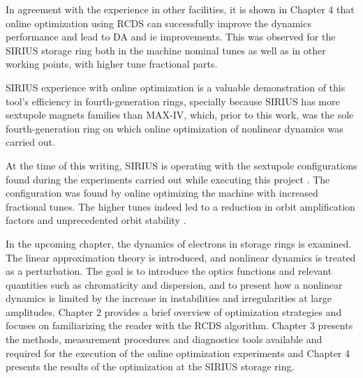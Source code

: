 In agreement with the experience in other facilities, it is shown in Chapter 4 that online optimization using \gls*{RCDS} can successfully improve the dynamics performance and lead to \gls*{DA} and \gls*{ie} improvements. This was observed for the SIRIUS storage ring both in the machine nominal tunes as well as in other working points, with higher tune fractional parts.

SIRIUS experience with online optimization is a valuable demonstration of this tool's efficiency in fourth-generation rings, specially because SIRIUS has more sextupole magnets families than MAX-IV, which, prior to this work, was the sole fourth-generation ring on which online optimization of nonlinear dynamics was carried out.

At the time of this writing, SIRIUS is operating with the sextupole configurations found during the experiments carried out while executing this project \cite{velloso_online_2023}. The configuration was found by online optimizing the machine with increased fractional tunes. The higher tunes indeed led to a reduction in orbit amplification factors and unprecedented orbit stability \cite{liu_status_2023}.

In the upcoming chapter, the dynamics of electrons in storage rings is examined. The linear approximation theory is introduced, and nonlinear dynamics is treated as a perturbation. The goal is to introduce the optics functions and relevant quantities such as chromaticity and dispersion, and to present how a nonlinear dynamics is limited by the increase in instabilities and irregularities at large amplitudes. Chapter 2 provides a brief overview of optimization strategies and focuses on familiarizing the reader with the \gls*{RCDS} algorithm. Chapter 3 presents the methods, measurement procedures and diagnostics tools available and required for the execution of the online optimization experiments and Chapter 4 presents the results of the optimization at the SIRIUS storage ring.
